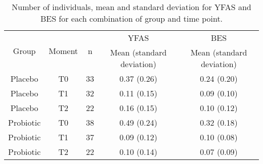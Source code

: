 \documentclass{article}
\begin{document}

\begin{table}[H]
\centering
\begin{tabular}{ccccc}
\hline
\multirow{2}{*}{Group} & \multirow{2}{*}{Moment}  & \multirow{2}{*}{n} & YFAS                  & BES                   \\ \cline{4-5} 
                       &                          &                    & Mean (standard deviation) & Mean (standard deviation) \\ \hline
Placebo                & T0                       & 33                 & 0.37 (0.26)           & 0.24 (0.20)           \\
Placebo                & T1                       & 32                 & 0.11 (0.15)           & 0.09 (0.10)           \\
Placebo                & T2                       & 22                 & 0.16 (0.15)           & 0.10 (0.12)           \\
Probiotic              & T0                       & 38                 & 0.49 (0.24)           & 0.32 (0.18)           \\
Probiotic              & T1                       & 37                 & 0.09 (0.12)           & 0.10 (0.08)           \\
Probiotic              & T2                       & 22                 & 0.10 (0.14)           & 0.07 (0.09)           \\ \hline
\end{tabular}
\caption{Number of individuals, mean and standard deviation for YFAS and BES for each combination of group and time point.}
\label{tab:tab1}
\end{table}

\end{document}
